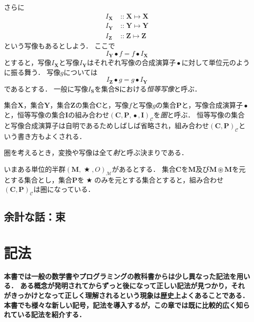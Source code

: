 \documentclass[twocolumn]{jsbook}
\DeclareMathOperator{\mathAnyBinaryOperator}{\bigstar}
\DeclareMathOperator{\mathCompose}{\bullet}
\DeclareMathOperator{\mathIn}{::}
\DeclareMathOperator{\mathMapsTo}{\mapsto}
\DeclareMathOperator{\mathSetTimes}{\circledast}
\newcommand{\mathSet}[1]{\mathbf{#1}}
\newcommand{\mathCategoryShort}[2]{(#1,#2)_\mathcal{C}}
\newcommand{\mathMorph}[2]{#1\mathMapsTo#2}
\newcommand{\mathMonoid}[3]{(#1,#2,#3)_\mathcal{M}}
\newcommand{\mathCategory}[4]{(#1,#2,#3,#4)_\mathcal{C}}
\newcommand{\keyword}[1]{\emph{#1}}
\newenvironment{leader}{\begingroup\bf}{\endgroup}
\begin{document}
さらに
\begin{align*}
I_\mathSet{X}&\mathIn\mathMorph{\mathSet{X}}{\mathSet{X}}\\
I_\mathSet{Y}&\mathIn\mathMorph{\mathSet{Y}}{\mathSet{Y}}\\
I_\mathSet{Z}&\mathIn\mathMorph{\mathSet{Z}}{\mathSet{Z}}
\end{align*}
という写像もあるとしよう．
ここで$$I_\mathSet{Y}\mathCompose f=f\mathCompose I_\mathSet{X}$$とすると，写像$I_\mathSet{X}$と写像$I_\mathSet{Y}$はそれぞれ写像の合成演算子$\mathCompose$に対して単位元のように振る舞う．
写像$g$については$$I_\mathSet{Z}\mathCompose g=g\mathCompose I_\mathSet{Y}$$であるとする．
一般に写像$I_\mathSet{S}$を集合$\mathSet{S}$における\keyword{恒等写像}と呼ぶ．

集合$\mathSet{X}$，集合$\mathSet{Y}$，集合$\mathSet{Z}$の集合$\mathSet{C}$と，写像$f$と写像$g$の集合$\mathSet{P}$と，写像合成演算子$\mathCompose$と，恒等写像の集合$\mathSet{I}$の組み合わせ$\mathCategory{\mathSet{C}}{\mathSet{P}}{\mathCompose}{\mathSet{I}}$を\keyword{圏}と呼ぶ．
恒等写像の集合と写像合成演算子は自明であるためしばしば省略され，組み合わせ$\mathCategoryShort{\mathSet{C}}{\mathSet{P}}$という書き方もよくされる．

圏を考えるとき，変換や写像は全て\keyword{射}と呼ぶ決まりである．

いまある単位的半群$\mathMonoid{\mathSet{M}}{\mathAnyBinaryOperator}{O}$があるとする．
集合$\mathSet{C}$を$\mathSet{M}$及び$\mathSet{M}\mathSetTimes\mathSet{M}$を元とする集合とし，集合$\mathSet{P}$を$\mathAnyBinaryOperator$のみを元とする集合とすると，組み合わせ$\mathCategoryShort{\mathSet{C}}{\mathSet{P}}$は圏になっている．

\section*{余計な話：束}


\chapter{記法}

\begin{leader}
本書では一般の数学書やプログラミングの教科書からは少し異なった記法を用いる．
ある概念が発明されてからずっと後になって正しい記法が見つかり，それがきっかけとなって正しく理解されるという現象は歴史上よくあることである．
本書でも様々な新しい記号，記法を導入するが，この章では既に比較的広く知られている記法を紹介する．
\end{leader}
\end{document}
